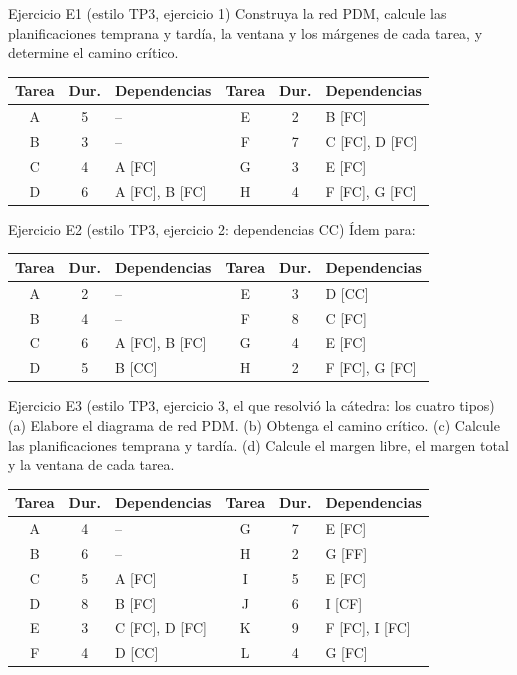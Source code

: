 \documentclass[11pt,a4paper]{article}
\begin{document}
\begin{enunciado}{Ejercicio E1 (estilo TP3, ejercicio 1)}
Construya la red PDM, calcule las planificaciones temprana y tardía, la ventana y los márgenes de cada tarea, y
determine el camino crítico.
\begin{center}\small
\begin{tabular}{ccl@{\qquad}ccl}
\toprule
Tarea & Dur. & Dependencias & Tarea & Dur. & Dependencias\\
\midrule
A & 5 & -- & E & 2 & B [FC]\\
B & 3 & -- & F & 7 & C [FC], D [FC]\\
C & 4 & A [FC] & G & 3 & E [FC]\\
D & 6 & A [FC], B [FC] & H & 4 & F [FC], G [FC]\\
\bottomrule
\end{tabular}
\end{center}
\end{enunciado}
\begin{enunciado}{Ejercicio E2 (estilo TP3, ejercicio 2: dependencias CC)}
Ídem para:
\begin{center}\small
\begin{tabular}{ccl@{\qquad}ccl}
\toprule
Tarea & Dur. & Dependencias & Tarea & Dur. & Dependencias\\
\midrule
A & 2 & -- & E & 3 & D [CC]\\
B & 4 & -- & F & 8 & C [FC]\\
C & 6 & A [FC], B [FC] & G & 4 & E [FC]\\
D & 5 & B [CC] & H & 2 & F [FC], G [FC]\\
\bottomrule
\end{tabular}
\end{center}
\end{enunciado}
\begin{enunciado}{Ejercicio E3 (estilo TP3, ejercicio 3, el que resolvió la cátedra: los cuatro tipos)}
(a) Elabore el diagrama de red PDM. (b) Obtenga el camino crítico. (c) Calcule las planificaciones temprana y
tardía. (d) Calcule el margen libre, el margen total y la ventana de cada tarea.
\begin{center}\small
\begin{tabular}{ccl@{\qquad}ccl}
\toprule
Tarea & Dur. & Dependencias & Tarea & Dur. & Dependencias\\
\midrule
A & 4 & -- & G & 7 & E [FC]\\
B & 6 & -- & H & 2 & G [FF]\\
C & 5 & A [FC] & I & 5 & E [FC]\\
D & 8 & B [FC] & J & 6 & I [CF]\\
E & 3 & C [FC], D [FC] & K & 9 & F [FC], I [FC]\\
F & 4 & D [CC] & L & 4 & G [FC]\\
\bottomrule
\end{tabular}
\end{center}
\end{enunciado}
\end{document}
